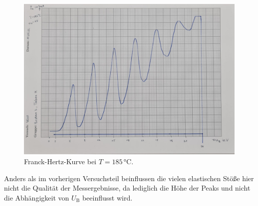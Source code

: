 \begin{figure}[H]
  \centering
  \includegraphics[height=8cm]{Messwerte/d.jpg}
  \caption{Franck-Hertz-Kurve bei $T=185\,\si{\celsius}$.}
  \label{Abb:d}
\end{figure}

Anders als im vorherigen Versuchsteil beinflussen die vielen elastischen Stöße hier nicht
die Qualität der Messergebnisse, da lediglich die Höhe der Peaks und nicht die Abhängigkeit
von $U_{\mathrm{B}}$ beeinflusst wird.  